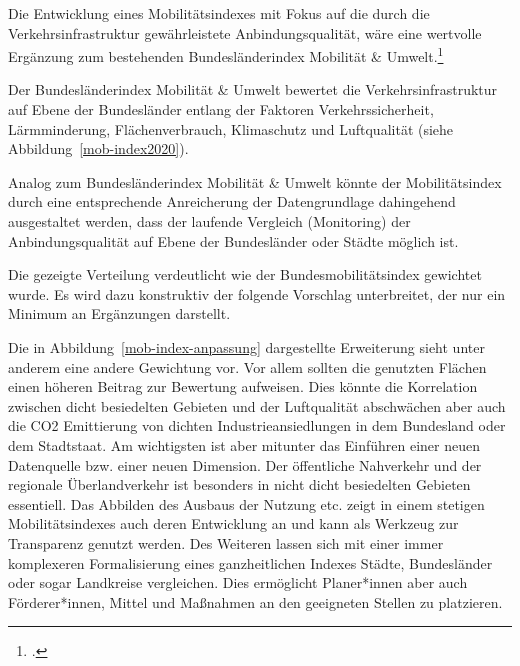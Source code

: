 Die Entwicklung eines Mobilitätsindexes mit Fokus auf die durch die Verkehrsinfrastruktur gewährleistete Anbindungsqualität, wäre eine wertvolle Ergänzung zum bestehenden Bundesländerindex Mobilität \& Umwelt.\footcite{Bundeslaenderindex:1}

Der Bundesländerindex Mobilität \& Umwelt bewertet die Verkehrsinfrastruktur auf Ebene der Bundesländer entlang der Faktoren Verkehrssicherheit, Lärmminderung, Flächenverbrauch, Klimaschutz und Luftqualität (siehe Abbildung~\ref{mob-index2020}).


Analog zum Bundesländerindex Mobilität \& Umwelt könnte der Mobilitätsindex durch eine entsprechende Anreicherung der Datengrundlage dahingehend ausgestaltet werden, dass der laufende Vergleich (Monitoring) der Anbindungsqualität auf Ebene der Bundesländer oder Städte möglich ist.


Die gezeigte Verteilung verdeutlicht wie der Bundesmobilitätsindex gewichtet wurde. Es wird dazu konstruktiv der folgende Vorschlag unterbreitet, der nur ein Minimum an Ergänzungen darstellt.


Die in Abbildung~\ref{mob-index-anpassung} dargestellte Erweiterung sieht unter anderem eine andere Gewichtung vor. Vor allem sollten die genutzten Flächen einen höheren Beitrag zur Bewertung aufweisen. Dies könnte die Korrelation zwischen dicht besiedelten Gebieten und der Luftqualität abschwächen aber auch die CO2 Emittierung von dichten Industrieansiedlungen in dem Bundesland oder dem Stadtstaat.
Am wichtigsten ist aber mitunter das Einführen einer neuen Datenquelle bzw. einer neuen Dimension. Der öffentliche Nahverkehr und der regionale Überlandverkehr ist besonders in nicht dicht besiedelten Gebieten essentiell.
Das Abbilden des Ausbaus der Nutzung etc. zeigt in einem stetigen Mobilitätsindexes auch deren Entwicklung an und kann als Werkzeug zur Transparenz genutzt werden.
Des Weiteren lassen sich mit einer immer komplexeren Formalisierung eines ganzheitlichen Indexes Städte, Bundesländer oder sogar Landkreise vergleichen. Dies ermöglicht Planer*innen aber auch Förderer*innen, Mittel und Maßnahmen an den geeigneten Stellen zu platzieren.
